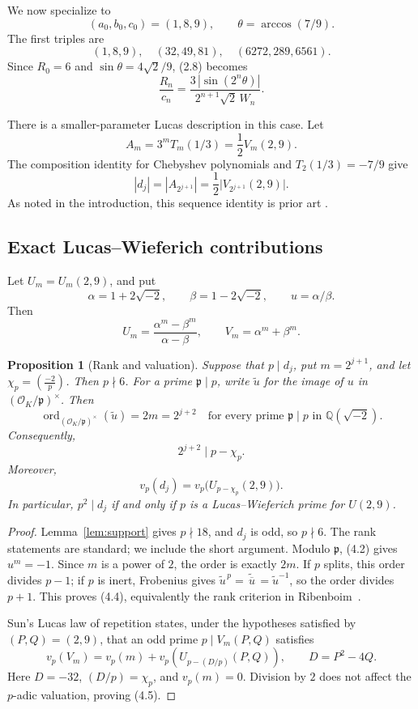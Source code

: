 \documentclass[11pt]{article}
\newtheorem{proposition}[theorem]{Proposition}
\theoremstyle{remark}
\newcommand{\ord}{\operatorname{ord}}
\newcommand{\QQ}{\mathbb{Q}}
\newcommand{\OK}{\mathcal{O}_K}
\begin{document}
We now specialize to
\[
 (a_0,b_0,c_0)=(1,8,9),\qquad
 \theta=\arccos(7/9).
\]
The first triples are
\[
 (1,8,9),\quad(32,49,81),\quad(6272,289,6561).
\]
Since \(R_0=6\) and \(\sin\theta=4\sqrt2/9\), (2.8) becomes
\[
 \boxed{\quad
 \frac{R_n}{c_n}
 =\frac{3\,|\sin(2^n\theta)|}
        {2^{n+1}\sqrt2\,W_n}.
 \quad}                                                    \tag{4.1}
\]

There is a smaller-parameter Lucas description in this case.  Let
\[
 A_m=3^mT_m(1/3)=\frac12V_m(2,9).
\]
The composition identity for Chebyshev polynomials and
\(T_2(1/3)=-7/9\) give
\[
 |d_j|=|A_{2^{j+1}}|
      =\frac12\bigl|V_{2^{j+1}}(2,9)\bigr|.                \tag{4.2}
\]
As noted in the introduction, this sequence identity is prior art
\cite{OEIS-A025172,BajorskaEtAl2019}.

\subsection{Exact Lucas--Wieferich contributions}

Let \(U_m=U_m(2,9)\), and put
\[
 \alpha=1+2\sqrt{-2},\qquad
 \beta=1-2\sqrt{-2},\qquad u=\alpha/\beta.
\]
Then
\[
 U_m=\frac{\alpha^m-\beta^m}{\alpha-\beta},\qquad
 V_m=\alpha^m+\beta^m.
\]

\begin{proposition}[Rank and valuation]\label{prop:valuation}
Suppose that \(p\mid d_j\), put \(m=2^{j+1}\), and let
\(\chi_p=\left(\frac{-2}{p}\right)\).  Then \(p\nmid6\).  For a prime
\(\mathfrak p\mid p\), write \(\widetilde u\) for the image of \(u\) in
\((\OK/\mathfrak p)^\times\).  Then
\[
 \ord_{(\OK/\mathfrak p)^\times}(\widetilde u)=2m=2^{j+2}
 \quad\text{for every prime }\mathfrak p\mid p
 \text{ in }\QQ(\sqrt{-2}).                               \tag{4.3}
\]
Consequently,
\[
 2^{j+2}\mid p-\chi_p.                                    \tag{4.4}
\]
Moreover,
\[
 v_p(d_j)=v_p\bigl(U_{p-\chi_p}(2,9)\bigr).                \tag{4.5}
\]
In particular, \(p^2\mid d_j\) if and only if \(p\) is a
Lucas--Wieferich prime for \(U(2,9)\).
\end{proposition}

\begin{proof}
Lemma~\ref{lem:support} gives \(p\nmid18\), and \(d_j\) is odd, so
\(p\nmid6\).  The rank statements are standard; we include the short
argument.
Modulo \(\mathfrak p\), (4.2) gives \(u^m=-1\).  Since \(m\) is a power
of \(2\), the order is exactly \(2m\).  If \(p\) splits, this order
divides \(p-1\); if \(p\) is inert, Frobenius gives
\(\widetilde u^{\,p}=\widetilde{\,\overline u\,}
 =\widetilde u^{-1}\), so the order divides
\(p+1\).  This proves (4.4), equivalently the rank criterion in
Ribenboim~\cite[\S2.13]{Ribenboim2001}.

Sun's Lucas law of repetition
\cite[Theorem~3(ii)]{Sun2013} states, under the hypotheses satisfied by
\((P,Q)=(2,9)\), that an odd prime \(p\mid V_m(P,Q)\) satisfies
\[
 v_p(V_m)=v_p(m)+v_p\left(U_{p-(D/p)}(P,Q)\right),
 \qquad D=P^2-4Q.
\]
Here \(D=-32\), \((D/p)=\chi_p\), and \(v_p(m)=0\).  Division by \(2\)
does not affect the \(p\)-adic valuation, proving (4.5).
\end{proof}
\end{document}
